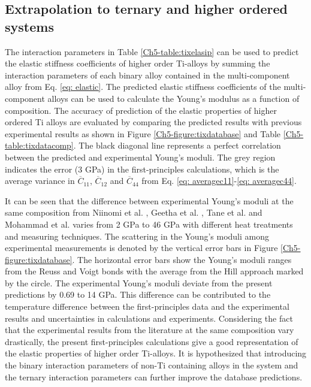 \subsection{Extrapolation to ternary and higher ordered systems}

The interaction parameters in Table \ref{Ch5-table:tixelasip} can be used to predict the elastic stiffness coefficients of higher order Ti-alloys by summing the interaction parameters of each binary alloy contained in the multi-component alloy from Eq. \ref{eq: elastic}. The predicted elastic stiffness coefficients of the multi-component alloys can be used to calculate the Young's modulus as a function of composition. The accuracy of prediction of the elastic properties of higher ordered Ti alloys are evaluated by comparing the predicted results with previous experimental results \cite{Niinomi2012,Tane2010a,Geetha2009,Mohammed2014} as shown in Figure \ref{Ch5-figure:tixdatabase} and Table \ref{Ch5-table:tixdatacomp}. The black diagonal line represents a perfect correlation between the predicted and experimental Young's moduli. The grey region indicates the error (3 GPa) in the first-principles calculations, which is the average variance in $\overline{C}_{11}$, $\overline{C}_{12}$ and $\overline{C}_{44}$ from Eq. \ref{eq: averagec11}-\ref{eq: averagec44}. 

It can be seen that the difference between experimental Young's moduli at the same composition from Niinomi et al. \cite{Niinomi2012}, Geetha et al. \cite{Geetha2009}, Tane et al. \cite{Tane2010a} and Mohammad et al. \cite{Mohammed2014} varies from 2 GPa to 46 GPa with different heat treatments and measuring techniques. The scattering in the Young's moduli among experimental measurements is denoted by the vertical error bars in Figure \ref{Ch5-figure:tixdatabase}. The horizontal error bars show the Young's moduli ranges from the Reuss and Voigt bonds with the average from the Hill approach marked by the circle. The experimental Young's moduli deviate from the present predictions by 0.69 to 14 GPa. This difference can be contributed to the temperature difference between the first-principles data and the experimental results and uncertainties in calculations and experiments. Considering the fact that the experimental results from the literature at the same composition vary drastically, the present first-principles calculations give a good representation of the elastic properties of higher order Ti-alloys. It is hypothesized that introducing the binary interaction parameters of non-Ti containing alloys in the system and the ternary interaction parameters can further improve the database predictions. 

